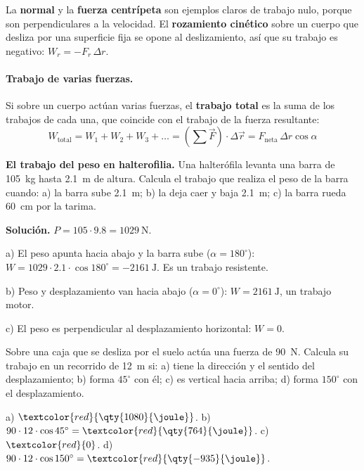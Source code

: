 La \textbf{normal} y la \textbf{fuerza centrípeta} son ejemplos claros de trabajo nulo, porque son perpendiculares a la velocidad. El
\textbf{rozamiento cinético} sobre un cuerpo que desliza por una superficie fija se opone al deslizamiento, así que su trabajo es
negativo: \(W_r = -F_r\,\Delta r\).

\paragraph{Trabajo de varias fuerzas.} Si sobre un cuerpo actúan varias fuerzas, el \textbf{trabajo total} es la suma de los trabajos
de cada una, que coincide con el trabajo de la fuerza resultante:
\[ W_{\text{total}} = W_1 + W_2 + W_3 + \dots = \left(\sum \vec{F}\right) \cdot \Delta\vec{r} = F_{\text{neta}}\,\Delta r\cos\alpha \]

\begin{example}
    \textbf{El trabajo del peso en halterofilia.} Una halterófila levanta una barra de \qty{105}{\kg} hasta \qty{2.1}{\m} de altura.
    Calcula el trabajo que realiza el peso de la barra cuando: a) la barra sube \qty{2.1}{\m}; b) la deja caer y baja \qty{2.1}{\m};
    c) la barra rueda \qty{60}{\cm} por la tarima.

    \textbf{Solución.} \(P = 105 \cdot \num{9.8} = \qty{1029}{\newton}\).

    a) El peso apunta hacia abajo y la barra sube (\(\alpha = 180^\circ\)): \(W = 1029 \cdot \num{2.1} \cdot \cos 180^\circ = \qty{-2161}{\joule}\).
    Es un trabajo resistente.

    b) Peso y desplazamiento van hacia abajo (\(\alpha = 0^\circ\)): \(W = \qty{+2161}{\joule}\), un trabajo motor.

    c) El peso es perpendicular al desplazamiento horizontal: \(W = 0\).
\end{example}

\begin{exercise}
    Sobre una caja que se desliza por el suelo actúa una fuerza de \qty{90}{\newton}. Calcula su trabajo en un recorrido de \qty{12}{\m}
    si: a) tiene la dirección y el sentido del desplazamiento; b) forma \(45^\circ\) con él; c) es vertical hacia arriba; d) forma
    \(150^\circ\) con el desplazamiento.
    \begin{solu}
        a) \(\textcolor{red}{\qty{1080}{\joule}}\). b) \(90 \cdot 12 \cdot \cos 45^\circ = \textcolor{red}{\qty{764}{\joule}}\). c)
        \(\textcolor{red}{0}\). d) \(90 \cdot 12 \cdot \cos 150^\circ = \textcolor{red}{\qty{-935}{\joule}}\).
    \end{solu}
\end{exercise}

